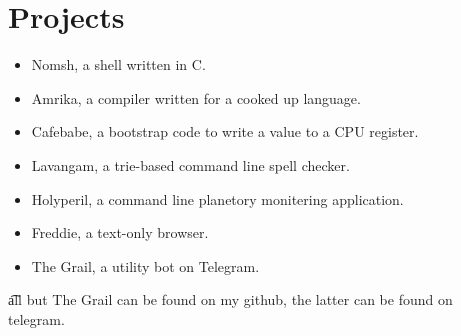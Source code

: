 \documentclass{article}
\begin{document}
\section*{Projects}
\begin{itemize}
\item Nomsh, a shell written in C.
\item Amrika, a compiler written for a cooked up language.
\item Cafebabe, a bootstrap code to write a value to a CPU register.
\item Lavangam, a trie-based command line spell checker.
\item Holyperil, a command line planetory monitering application. 
\item Freddie, a text-only browser.
\item The Grail, a utility bot on Telegram.
\end{itemize}
\t all but The Grail can be found on my github, the latter can be found on telegram.
\end{document}
